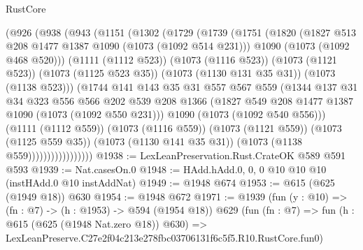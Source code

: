 \begin{lexlean}{RustCore}
\begin{coremodule}
                  (@926
                    (@938
                      (@943
                        (@1151
                          (@1302
                            (@1729
                              (@1739
                                (@1751
                                  (@1820
                                    (@1827 @513 @208 @1477 @1387 @1090 (@1073 (@1092 @514 @231)))
                                    @1090
                                    (@1073 (@1092 @468 @520)))
                                  (@1111 (@1112 @523))
                                  (@1073 (@1116 @523))
                                  (@1073 (@1121 @523))
                                  (@1073 (@1125 @523 @35))
                                  (@1073 (@1130 @131 @35 @31))
                                  (@1073 (@1138 @523)))
                                (@1744
                                  @141
                                  @143
                                  @35
                                  @31
                                  @557
                                  @567
                                  @559
                                  (@1344
                                    @137
                                    @31
                                    @34
                                    @323
                                    @556
                                    @566
                                    @202
                                    @539
                                    @208
                                    @1366
                                    (@1827 @549 @208 @1477 @1387 @1090 (@1073 (@1092 @550 @231)))
                                    @1090
                                    (@1073 (@1092 @540 @556)))
                                  (@1111 (@1112 @559))
                                  (@1073 (@1116 @559))
                                  (@1073 (@1121 @559))
                                  (@1073 (@1125 @559 @35))
                                  (@1073 (@1130 @141 @35 @31))
                                  (@1073 (@1138 @559)))))))))))))))))
@1938 := LexLeanPreservation.Rust.CrateOK @589 @591 @593
@1939 := Nat.casesOn.{0}
@1948 := HAdd.hAdd.{0, 0, 0} @10 @10 @10 (instHAdd.{0} @10 instAddNat)
@1949 := @1948 @674
@1953 := @615 (@625 (@1949 @18)) @630
@1954 := @1948 @672
@1971 := @1939
    (fun (y : @10) => (fn : @7) -> (h : @1953) -> @594 (@1954 @18))
    @629
    (fun (fn : @7) =>
    fun (h : @615 (@625 (@1948 Nat.zero @18)) @630) =>
    LexLeanPreserve.C27e2f04c213e278fbc03706131f6c5f5.R10.RustCore.fun0)

\end{coremodule}
\end{lexlean}
